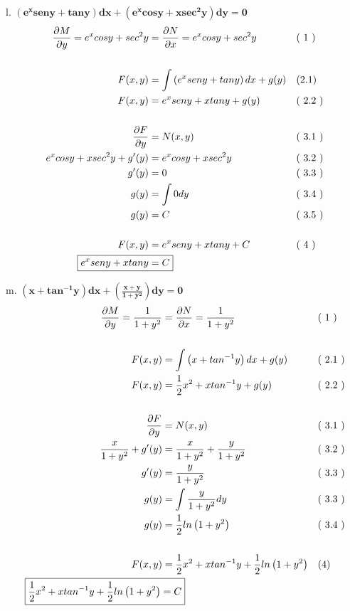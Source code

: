 \documentclass{article}
\newcommand{\newLine}[3]{ #1 & = #2 && \text{(#3)}\\ }
\newcommand{\finalAnswer}[2]{ \Aboxed{ #1 & = #2 } }
\newcommand{\p}[1]{ \left( #1 \right) }
\newcommand{\newProblem}[2]{ \hspace{10mm} #1. $
\boldsymbol{ #2 }
$  \break }
\newcommand{\e}[1]{e^{#1}}
\newcommand{\pD}[2]{ \frac{\partial #1}{\partial #2} }
\begin{document}
\begin{flushleft}
        \newProblem{l}{ ( \e{x}seny + tany )dx + ( \e{x}cosy + xsec^{2}y )dy = 0 }
         \begin{align*}
             \newLine{ \frac{\partial M}{\partial y} = \e{x}cosy + sec^{2}y } { \frac{\partial N}{\partial x} = \e{x}cosy + sec^{2}y } { 1 }
             \\
             \newLine{F(x,y)}{\int \p{\e{x}seny + tany} dx + g(y)}{2.1}
             \newLine{F(x,y)}{ \e{x}seny + xtany + g(y) }{ 2.2 }
             \\
             \newLine{ \frac{\partial F}{\partial y} } { N(x,y) } { 3.1 }
             \newLine{ \e{x}cosy + xsec^{2}y + g'(y) } { \e{x}cosy + xsec^{2}y } { 3.2 }
             \newLine{ g'(y) } { 0 } { 3.3 }
             \newLine{ g(y) } { \int 0 dy } { 3.4 }
             \newLine{ g(y) } { C } { 3.5 }
             \\
             \newLine{ F(x,y) }{ \e{x}seny + xtany + C }{ 4 }
             \finalAnswer{ \e{x}seny + xtany }{ C }
         \end{align*}

         \newProblem{m}{ \p{x + tan^{-1}y}dx + \p{ \frac{x+y}{1+y^2} }dy = 0 }
            \begin{align*}
                \newLine{ \pD{M}{y} = \frac{1}{1+y^2} } { \pD{N}{x} = \frac{1}{1+y^2} } { 1 }
                \\
                    \newLine{ F(x,y) } { \int \p{x + tan^{-1}y}dx + g(y) } { 2.1 }
                    \newLine{ F(x,y) } { \frac{1}{2}x^2 + xtan^{-1}y + g(y) } { 2.2 }
                \\
                    \newLine{ \pD{F}{y} } { N(x,y) } { 3.1 }
                    \newLine{ \frac{x}{1+y^2} + g'(y) } { \frac{x}{1+y^2} + \frac{y}{1+y^2} } { 3.2 }
                    \newLine{ g'(y) } { \frac{y}{1+y^2} } { 3.3 }
                    \newLine{ g(y) } { \int \frac{y}{1+y^2}dy } { 3.3 }
                    \newLine{ g(y) } { \frac{1}{2}ln\p{1+y^2} } { 3.4 }
                \\
                \newLine{ F(x,y) } { \frac{1}{2}x^2 + xtan^{-1}y + \frac{1}{2}ln\p{1+y^2} } {4}
                \finalAnswer{ \frac{1}{2}x^2 + xtan^{-1}y + \frac{1}{2}ln\p{1+y^2} }{ C }
            \end{align*}
        

\end{flushleft}
\end{document}
